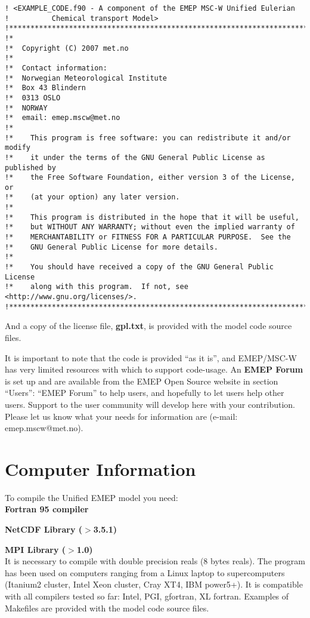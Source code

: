 \begin{verbatim}
! <EXAMPLE_CODE.f90 - A component of the EMEP MSC-W Unified Eulerian
!          Chemical transport Model>
!*****************************************************************************!
!*
!*  Copyright (C) 2007 met.no
!*
!*  Contact information:
!*  Norwegian Meteorological Institute
!*  Box 43 Blindern
!*  0313 OSLO
!*  NORWAY
!*  email: emep.mscw@met.no
!*
!*    This program is free software: you can redistribute it and/or modify
!*    it under the terms of the GNU General Public License as published by
!*    the Free Software Foundation, either version 3 of the License, or
!*    (at your option) any later version.
!*
!*    This program is distributed in the hope that it will be useful,
!*    but WITHOUT ANY WARRANTY; without even the implied warranty of
!*    MERCHANTABILITY or FITNESS FOR A PARTICULAR PURPOSE.  See the
!*    GNU General Public License for more details.
!*
!*    You should have received a copy of the GNU General Public License
!*    along with this program.  If not, see <http://www.gnu.org/licenses/>.
!*****************************************************************************!
\end{verbatim}

And a copy of the license file, {\bf gpl.txt}, is provided with the
model code source files.

\noindent It is important to note that the code is provided ``as it is'', 
and EMEP/MSC-W has very limited resources with which to support
code-usage. An {\bf EMEP Forum} is set up and are available from the
EMEP Open Source website in section ``Users'': ``EMEP Forum''
to help users, and hopefully to let users help other users.
Support to the user community will develop here with your
contribution. 
Please let us know what your needs for information are 
(e-mail: emep.mscw@met.no).


\section{Computer Information}

To compile the Unified EMEP model you need:\\

\textbf{Fortran 95 compiler}

\textbf{NetCDF Library ($>$3.5.1)}

\textbf{MPI Library ($>$1.0)}\\

It is necessary to compile with double precision reals (8 bytes
reals). The program has been used on computers ranging from a Linux laptop to supercomputers 
(Itanium2 cluster, Intel Xeon cluster, Cray XT4, IBM power5+). It is compatible with all 
compilers tested so far:  Intel, PGI, gfortran, XL fortran. Examples of Makefiles are provided 
with the model code source files.

